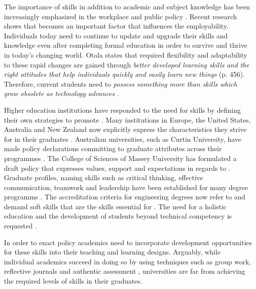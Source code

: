 The importance of \LLLs skills in addition to academic and subject knowledge has
been increasingly emphasized in the workplace and public policy
\citep{Morgan-Klein2007,Sutherland2006}. Recent research
\citep{Simmons-McDonald2009} shows that \LLLs becomes an important factor that
influences the employability. Individuals today need to continue to update and
upgrade their skills and knowledge even after completing formal education in
order to survive and thrive in today's changing world. Otala
\citeyearpar{Otala1997} states that required flexibility and adaptability to
these rapid changes are gained through \textit{better developed learning skills
and the right attitudes that help individuals quickly and easily learn new
things} (p. 456). Therefore, current students need to \textit{possess something
more than skills which grow obsolete as technology advances}
\cite[p.~195]{Field2003}.

Higher education institutions have responded to the need for \LLLs skills by
defining their own strategies to promote \LLLsn. Many institutions in Europe,
the United States, Australia and New Zealand now explicitly express the \LLLs
characteristics they strive for in their graduates \citep{Scanlon2006}.
Australian universities, such as Curtin University, have made policy
declarations committing to graduate attributes across their programmes
\citep{CurtinUniversity2006}. The College of Sciences of Massey University has
formulated a draft \LLLs policy \citep{MasseyUniversity2008} that expresses
values, support and expectations in regards to \LLLsn. Graduate profiles, naming
\LLLs skills such as critical thinking, effective communication, teamwork and
leadership have been established for many degree programme
\citep{Davies2003,McAlister2003}. The accreditation criteria for engineering
degrees now refer to and demand soft skills that are the skills essential for
\LLLs \citep{Aller2005,Muffo2001}.
The need for a holistic education and the development of students beyond technical
competency is requested
\citep{Brakke2002,Davies2003,Dowling2006,Fallows2003,Grabowski2004,Hernon2006}.

In order to enact policy academics need to incorporate development opportunities
for these skills into their teaching and learning designs. Arguably, while
individual academics succeed in doing so by using techniques such as group work,
reflective journals and authentic assessment \citep{Clarke2003,Lombardi2008},
universities are far from achieving the required levels of \LLLs skills in their
graduates.

